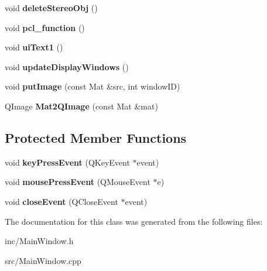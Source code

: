 \begin{DoxyCompactItemize}
\item 
void {\bfseries delete\+Stereo\+Obj} ()\hypertarget{class_main_window_ae2ce9912561d8dc2973e96c46f57e7ba}{}\label{class_main_window_ae2ce9912561d8dc2973e96c46f57e7ba}

\item 
void {\bfseries pcl\+\_\+function} ()\hypertarget{class_main_window_a6c84072423be2737b33638670b2989b6}{}\label{class_main_window_a6c84072423be2737b33638670b2989b6}

\item 
void {\bfseries ui\+Text1} ()\hypertarget{class_main_window_af8d7ca80e733f594228f2bccdd083431}{}\label{class_main_window_af8d7ca80e733f594228f2bccdd083431}

\item 
void {\bfseries update\+Display\+Windows} ()\hypertarget{class_main_window_adf47e0731156f25c8f20f2a63b03cce6}{}\label{class_main_window_adf47e0731156f25c8f20f2a63b03cce6}

\item 
void {\bfseries put\+Image} (const Mat \&src, int window\+ID)\hypertarget{class_main_window_a1419aa870a37faeca4af58b6f00667cf}{}\label{class_main_window_a1419aa870a37faeca4af58b6f00667cf}

\item 
Q\+Image {\bfseries Mat2\+Q\+Image} (const Mat \&mat)\hypertarget{class_main_window_a42603613411483022b7b581948e5f418}{}\label{class_main_window_a42603613411483022b7b581948e5f418}

\end{DoxyCompactItemize}
\subsection*{Protected Member Functions}
\begin{DoxyCompactItemize}
\item 
void {\bfseries key\+Press\+Event} (Q\+Key\+Event $\ast$event)\hypertarget{class_main_window_a9c4f542263838b9ecd06eae839a42a34}{}\label{class_main_window_a9c4f542263838b9ecd06eae839a42a34}

\item 
void {\bfseries mouse\+Press\+Event} (Q\+Mouse\+Event $\ast$e)\hypertarget{class_main_window_aed2bdf63a7640182adfd5e959ea672d2}{}\label{class_main_window_aed2bdf63a7640182adfd5e959ea672d2}

\item 
void {\bfseries close\+Event} (Q\+Close\+Event $\ast$event)\hypertarget{class_main_window_a4e20a4a065fbb0e4d3532a45a0a91425}{}\label{class_main_window_a4e20a4a065fbb0e4d3532a45a0a91425}

\end{DoxyCompactItemize}


The documentation for this class was generated from the following files\+:\begin{DoxyCompactItemize}
\item 
inc/Main\+Window.\+h\item 
src/Main\+Window.\+cpp\end{DoxyCompactItemize}
